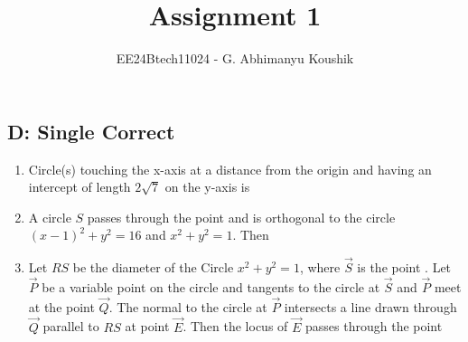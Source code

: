 \documentclass[journal,12pt,twocolumn]{IEEEtran}
\theoremstyle{remark}
\begin{document}
\title{Assignment 1}
\author{EE24Btech11024 - G. Abhimanyu Koushik}
\maketitle
\renewcommand{\thefigure}{\theenumi}
\renewcommand{\thetable}{\theenumi}
\subsection*{D: Single Correct}
\begin{enumerate}
\item Circle(s) touching the x-axis at a distance  from the origin and having an intercept of length $2\sqrt{7}$ on the y-axis is 

\hfill{}
\begin{enumerate}
\end{enumerate}
\item A circle $S$ passes through the point  and is orthogonal to the circle $(x-1)^2+y^2=16$ and $x^2+y^2=1$. Then

\hfill {}
\begin{enumerate}
\end{enumerate}
\item Let $RS$ be the diameter of the Circle $x^{2} + y^{2} = 1$, where $\vec{S}$ is the point . Let $\vec{P}$ be a variable point  on the circle and tangents to the circle at $\vec{S}$ and $\vec{P}$ meet at the point $\vec{Q}$. The normal to the circle at $\vec{P}$ intersects a line drawn through $\vec{Q}$ parallel to $RS$ at point $\vec{E}$. Then the locus of $\vec{E}$ passes through the point


\end{enumerate}
\end{document}
